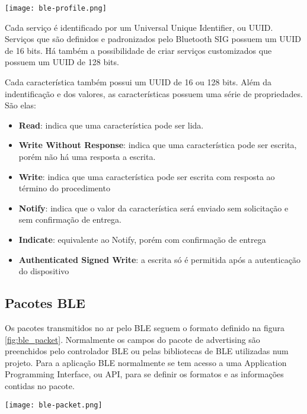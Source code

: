 \begin{center}
	\centering 
	\texttt{[image: ble-profile.png]}  
	\label{fig:ble_profile}
\end{center}  

Cada serviço é identificado por um Universal Unique Identifier, ou UUID.
Serviços que são definidos e padronizados pelo Bluetooth SIG possuem um UUID de
16 bits. Há também a possibilidade de criar serviços customizados que possuem um
UUID de 128 bits.

Cada característica também possui um UUID de 16 ou 128 bits. Além da
indentificação e dos valores, as características possuem uma série de
propriedades. São elas:

\begin{itemize}[noitemsep]
  \item \textbf{Read}: indica que uma característica pode ser lida.
  \item \textbf{Write Without Response}: indica que uma característica pode ser
  escrita, porém não há uma resposta a escrita.
  \item \textbf{Write}: indica que uma característica pode ser escrita com
  resposta ao término do procedimento
  \item \textbf{Notify}: indica que o valor da característica será enviado sem
  solicitação e sem confirmação de entrega.
  \item \textbf{Indicate}: equivalente ao Notify, porém com confirmação de
  entrega
  \item \textbf{Authenticated Signed Write}: a escrita só é permitida após a
  autenticação do dispositivo
\end{itemize}

\subsection{Pacotes BLE}

Os pacotes transmitidos no ar pelo BLE seguem o formato definido na figura
\ref{fig:ble_packet}. Normalmente os campos do pacote de advertising são
preenchidos pelo controlador BLE ou pelas bibliotecas de BLE utilizadas num
projeto. Para a aplicação BLE normalmente se tem acesso a uma Application
Programming Interface, ou API, para se definir os formatos e as informações
contidas no pacote.

\begin{center}
	\centering 
	\texttt{[image: ble-packet.png]}  
	\label{fig:ble_packet}
\end{center}  

